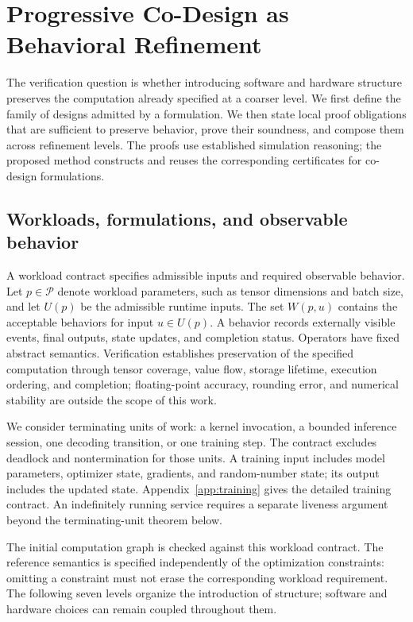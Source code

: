 \documentclass[11pt]{article}
\begin{document}
\section{Progressive Co-Design as Behavioral Refinement}\label{sec:formal}
The verification question is whether introducing software and hardware structure preserves the computation already specified at a coarser level. We first define the family of designs admitted by a formulation. We then state local proof obligations that are sufficient to preserve behavior, prove their soundness, and compose them across refinement levels. The proofs use established simulation reasoning; the proposed method constructs and reuses the corresponding certificates for co-design formulations.

\subsection{Workloads, formulations, and observable behavior}
A workload contract specifies admissible inputs and required observable behavior. Let $p\in\mathcal P$ denote workload parameters, such as tensor dimensions and batch size, and let $U(p)$ be the admissible runtime inputs. The set $W(p,u)$ contains the acceptable behaviors for input $u\in U(p)$. A behavior records externally visible events, final outputs, state updates, and completion status. Operators have fixed abstract semantics. Verification establishes preservation of the specified computation through tensor coverage, value flow, storage lifetime, execution ordering, and completion; floating-point accuracy, rounding error, and numerical stability are outside the scope of this work.

We consider terminating units of work: a kernel invocation, a bounded inference session, one decoding transition, or one training step. The contract excludes deadlock and nontermination for those units. A training input includes model parameters, optimizer state, gradients, and random-number state; its output includes the updated state. Appendix~\ref{app:training} gives the detailed training contract. An indefinitely running service requires a separate liveness argument beyond the terminating-unit theorem below.

The initial computation graph is checked against this workload contract. The reference semantics is specified independently of the optimization constraints: omitting a constraint must not erase the corresponding workload requirement. The following seven levels organize the introduction of structure; software and hardware choices can remain coupled throughout them.
\end{document}
